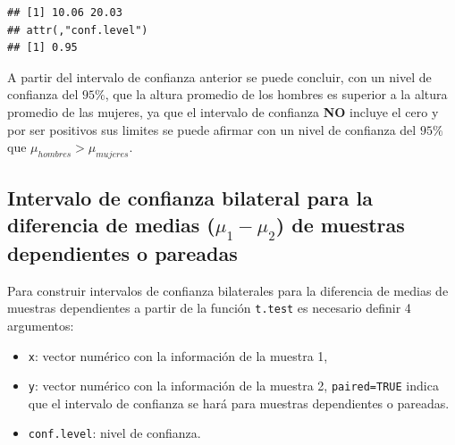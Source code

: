\documentclass[10pt,]{krantz}
\makeatletter
\newenvironment{Shaded}{\begin{snugshade}}{\end{snugshade}}
\newcommand{\KeywordTok}[1]{\textcolor[rgb]{0.13,0.29,0.53}{\textbf{#1}}}
\newcommand{\DataTypeTok}[1]{\textcolor[rgb]{0.13,0.29,0.53}{#1}}
\newcommand{\FloatTok}[1]{\textcolor[rgb]{0.00,0.00,0.81}{#1}}
\newcommand{\OtherTok}[1]{\textcolor[rgb]{0.56,0.35,0.01}{#1}}
\newcommand{\OperatorTok}[1]{\textcolor[rgb]{0.81,0.36,0.00}{\textbf{#1}}}
\newcommand{\NormalTok}[1]{#1}
\providecommand{\tightlist}{%
  \setlength{\itemsep}{0pt}\setlength{\parskip}{0pt}}
\newenvironment{kframe}{%
\medskip{}
\setlength{\fboxsep}{.8em}
 \def\at@end@of@kframe{}%
 \ifinner\ifhmode%
  \def\at@end@of@kframe{\end{minipage}}%
  \begin{minipage}{\columnwidth}%
 \fi\fi%
 \def\FrameCommand##1{\hskip\@totalleftmargin \hskip-\fboxsep
 \colorbox{shadecolor}{##1}\hskip-\fboxsep
     \hskip-\linewidth \hskip-\@totalleftmargin \hskip\columnwidth}%
 \MakeFramed {\advance\hsize-\width
   \@totalleftmargin\z@ \linewidth\hsize
   \@setminipage}}%
 {\par\unskip\endMakeFramed%
 \at@end@of@kframe}
\renewenvironment{Shaded}{\begin{kframe}}{\end{kframe}}
\makeatother
\begin{document}
\begin{Shaded}
\end{Shaded}

\begin{verbatim}
## [1] 10.06 20.03
## attr(,"conf.level")
## [1] 0.95
\end{verbatim}

A partir del intervalo de confianza anterior se puede concluir, con un
nivel de confianza del \(95\%\), que la altura promedio de los hombres
es superior a la altura promedio de las mujeres, ya que el intervalo de
confianza \textbf{NO} incluye el cero y por ser positivos sus limites se
puede afirmar con un nivel de confianza del \(95\%\) que
\(\mu_{hombres} > \mu_{mujeres}\).

\subsection{\texorpdfstring{Intervalo de confianza bilateral para la
diferencia de medias (\(\mu_1-\mu_2\)) de muestras dependientes o
pareadas}{Intervalo de confianza bilateral para la diferencia de medias (\textbackslash{}mu\_1-\textbackslash{}mu\_2) de muestras dependientes o pareadas}}\label{intervalo-de-confianza-bilateral-para-la-diferencia-de-medias-mu_1-mu_2-de-muestras-dependientes-o-pareadas}

Para construir intervalos de confianza bilaterales para la diferencia de
medias de muestras dependientes a partir de la función \texttt{t.test}
es necesario definir 4 argumentos:

\begin{itemize}
\tightlist
\item
  \texttt{x}: vector numérico con la información de la muestra 1,
\item
  \texttt{y}: vector numérico con la información de la muestra 2,
  \texttt{paired=TRUE} indica que el intervalo de confianza se hará para
  muestras dependientes o pareadas.
\item
  \texttt{conf.level}: nivel de confianza.
\end{itemize}
\end{document}
